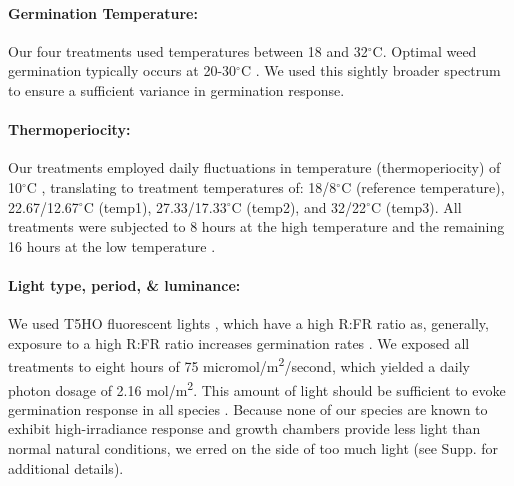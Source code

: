 \documentclass[12pt]{article}\usepackage[]{graphicx}\usepackage[]{color}
\begin{document}
	\paragraph{Germination Temperature:} Our four treatments used temperatures between 18 and 32$^\circ$C. Optimal weed germination typically occurs at 20-30$^\circ$C \parencite{Hartmann2010,Steinbauer1957,Wulff1994,Popay1970}. We used this  sightly broader spectrum to ensure a sufficient variance in germination response.
	
	\paragraph{Thermoperiocity:} Our treatments employed daily fluctuations in temperature (thermoperiocity) of 10$^\circ$C \parencite[see e.g.,][]{Steinbauer1957, Toole1963,ISTA1954}, translating to treatment temperatures of: 18/8$^\circ$C (reference temperature), 22.67/12.67$^\circ$C (temp1), 27.33/17.33$^\circ$C (temp2), and 32/22$^\circ$C (temp3). All treatments were subjected to 8 hours at the high temperature and the remaining 16 hours at the low temperature \parencite{Baskin1998,Roberts1981,Popay1970,Probert2000}. %

	\paragraph{Light type, period, \& luminance:} We used T5HO fluorescent lights \parencite{Toole1963}, which have a high R:FR ratio as, generally, exposure to a high R:FR ratio increases germination rates \parencite[though some studies find germination requires high R:FR ratio or is insensitive,][]{Popay1970,Pons2000,Wulff1994}. %
We exposed all treatments to eight hours \parencite[coinciding with the higher temperature,][]{Baskin1998} of 75 micromol/m\textsuperscript{2}/second, which yielded a daily photon dosage of 2.16 mol/m\textsuperscript{2}. This amount of light should be sufficient to evoke germination response in all species \parencite{Pons1991}. Because none of our species are known to exhibit high-irradiance response and  growth chambers provide less light than normal natural conditions, we erred on the side of too much light (see Supp. for additional details). %
	
\end{document}
